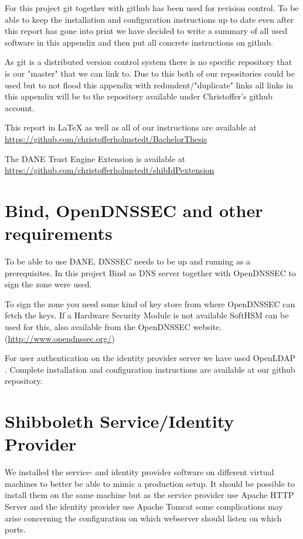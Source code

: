 For this project git together with github has been used for revision control.
To be able to keep the installation and configuration instructions up to date even after this report has gone into print we have decided to write a summary of all used software in this appendix and then put all concrete instructions on github.

As git is a distributed version control system there is no specific repository that is our "master" that we can link to.
Due to this both of our repositories could be used but to not flood this appendix with redundent/"duplicate" links all links in this appendix will be to the repository available under Christoffer's github account.

This report in LaTeX as well as all of our instructions are available at \\
\url{https://github.com/christofferholmstedt/BachelorThesis}

The DANE Trust Engine Extension is available at \\
\url{https://github.com/christofferholmstedt/shibIdPextension}

\section{Bind, OpenDNSSEC and other requirements}
To be able to use DANE, DNSSEC needs to be up and running as a prerequisites.
In this project Bind as DNS server together with OpenDNSSEC to sign the zone were used.

To sign the zone you need some kind of key store from where OpenDNSSEC can fetch the keys.
If a Hardware Security Module is not available SoftHSM can be used for this, also available from the OpenDNSSEC website.
(\url{http://www.opendnssec.org/})

For user authentication on the identity provider server we have used OpenLDAP \cite{website:openldap}.
Complete installation and configuration instructions are available at our github repository.

\section{Shibboleth Service/Identity Provider}
We installed the service- and identity provider software on different virtual machines to better be able to mimic a production setup.
It should be possible to install them on the same machine but as the service provider use Apache HTTP Server and the identity provider use Apache Tomcat some complications may arise concerning the configuration on which webserver should listen on which ports.

